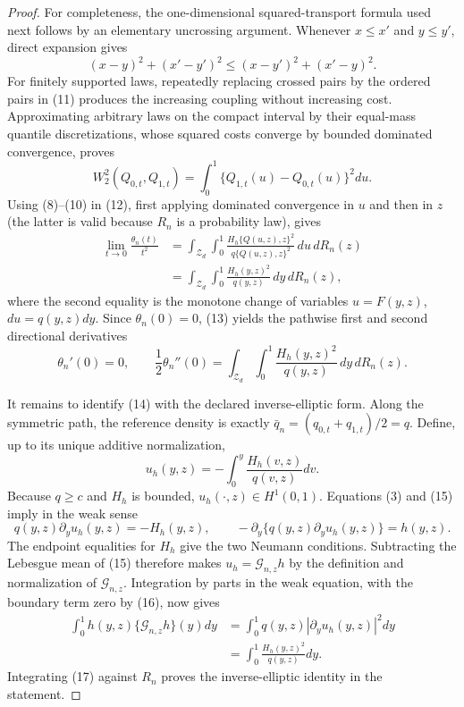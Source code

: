 \documentclass{article}
\begin{document}
\begin{proof}
For completeness, the one-dimensional squared-transport formula used next follows by an elementary uncrossing argument.  Whenever \(x\le x'\) and \(y\le y'\), direct expansion gives
\[
(x-y)^2+(x'-y')^2
\le (x-y')^2+(x'-y)^2.
\tag{11}
\]
For finitely supported laws, repeatedly replacing crossed pairs by the ordered pairs in (11) produces the increasing coupling without increasing cost.  Approximating arbitrary laws on the compact interval by their equal-mass quantile discretizations, whose squared costs converge by bounded dominated convergence, proves
\[
W_2^2(Q_{0,t},Q_{1,t})
=\int_0^1\{Q_{1,t}(u)-Q_{0,t}(u)\}^2du.
\tag{12}
\]
Using (8)--(10) in (12), first applying dominated convergence in \(u\) and then in \(z\) (the latter is valid because \(R_n\) is a probability law), gives
\[
\begin{aligned}
\lim_{t\to0}\frac{\theta_n(t)}{t^2}
&=\int_{\mathcal Z_d}\int_0^1
  \frac{H_h\{Q(u,z),z\}^2}{q\{Q(u,z),z\}^2}
  \,du\,dR_n(z)\\
&=\int_{\mathcal Z_d}\int_0^1
  \frac{H_h(y,z)^2}{q(y,z)}\,dy\,dR_n(z),
\end{aligned}
\tag{13}
\]
where the second equality is the monotone change of variables \(u=F(y,z)\), \(du=q(y,z)dy\).  Since \(\theta_n(0)=0\), (13) yields the pathwise first and second directional derivatives
\[
\theta_n'(0)=0,
\qquad
\frac12\theta_n''(0)
=\int_{\mathcal Z_d}\int_0^1
  \frac{H_h(y,z)^2}{q(y,z)}\,dy\,dR_n(z).
\tag{14}
\]

It remains to identify (14) with the declared inverse-elliptic form.  Along the symmetric path, the reference density is exactly \(\bar q_n=(q_{0,t}+q_{1,t})/2=q\).  Define, up to its unique additive normalization,
\[
u_h(y,z)=-\int_0^y\frac{H_h(v,z)}{q(v,z)}dv.
\tag{15}
\]
Because \(q\ge c\) and \(H_h\) is bounded, \(u_h(\cdot,z)\in H^1(0,1)\).  Equations (3) and (15) imply in the weak sense
\[
q(y,z)\partial_yu_h(y,z)=-H_h(y,z),
\qquad
-\partial_y\{q(y,z)\partial_yu_h(y,z)\}=h(y,z).
\tag{16}
\]
The endpoint equalities for \(H_h\) give the two Neumann conditions.  Subtracting the Lebesgue mean of (15) therefore makes \(u_h=\mathcal G_{n,z}h\) by the definition and normalization of \(\mathcal G_{n,z}\).  Integration by parts in the weak equation, with the boundary term zero by (16), now gives
\[
\begin{aligned}
\int_0^1h(y,z)\{\mathcal G_{n,z}h\}(y)dy
&=\int_0^1q(y,z)|\partial_yu_h(y,z)|^2dy\\
&=\int_0^1\frac{H_h(y,z)^2}{q(y,z)}dy.
\end{aligned}
\tag{17}
\]
Integrating (17) against \(R_n\) proves the inverse-elliptic identity in the statement.


\end{proof}
\end{document}
